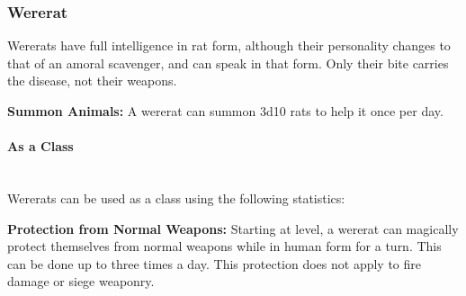\begin{multicols*}{2}
\subsubsection{Wererat}

Wererats have full intelligence in rat form, although their personality changes to that of an amoral scavenger, and can speak in that form. Only their bite carries the disease, not their weapons.

\textbf{Summon Animals:} A wererat can summon 3d10 rats to help it once per day.

\paragraph{As a Class}\mbox{}\\
Wererats can be used as a class using the following statistics:

\textbf{Protection from Normal Weapons:} Starting at  level, a wererat can magically protect themselves from normal weapons while in human form for a turn. This can be done up to three times a day. This protection does not apply to fire damage or siege weaponry.

\end{multicols*}
